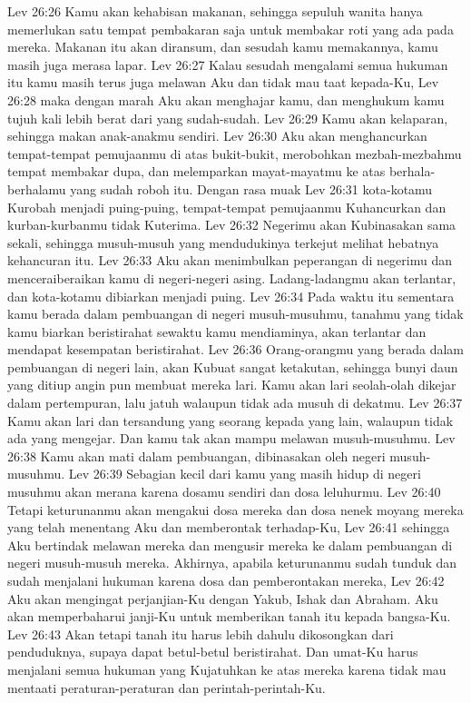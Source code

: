 Lev 26:26  Kamu akan kehabisan makanan, sehingga sepuluh wanita hanya memerlukan satu tempat pembakaran saja untuk membakar roti yang ada pada mereka. Makanan itu akan diransum, dan sesudah kamu memakannya, kamu masih juga merasa lapar.
Lev 26:27  Kalau sesudah mengalami semua hukuman itu kamu masih terus juga melawan Aku dan tidak mau taat kepada-Ku,
Lev 26:28  maka dengan marah Aku akan menghajar kamu, dan menghukum kamu tujuh kali lebih berat dari yang sudah-sudah.
Lev 26:29  Kamu akan kelaparan, sehingga makan anak-anakmu sendiri.
Lev 26:30  Aku akan menghancurkan tempat-tempat pemujaanmu di atas bukit-bukit, merobohkan mezbah-mezbahmu tempat membakar dupa, dan melemparkan mayat-mayatmu ke atas berhala-berhalamu yang sudah roboh itu. Dengan rasa muak
Lev 26:31  kota-kotamu Kurobah menjadi puing-puing, tempat-tempat pemujaanmu Kuhancurkan dan kurban-kurbanmu tidak Kuterima.
Lev 26:32  Negerimu akan Kubinasakan sama sekali, sehingga musuh-musuh yang mendudukinya terkejut melihat hebatnya kehancuran itu.
Lev 26:33  Aku akan menimbulkan peperangan di negerimu dan menceraiberaikan kamu di negeri-negeri asing. Ladang-ladangmu akan terlantar, dan kota-kotamu dibiarkan menjadi puing.
Lev 26:34  Pada waktu itu sementara kamu berada dalam pembuangan di negeri musuh-musuhmu, tanahmu yang tidak kamu biarkan beristirahat sewaktu kamu mendiaminya, akan terlantar dan mendapat kesempatan beristirahat.
Lev 26:36  Orang-orangmu yang berada dalam pembuangan di negeri lain, akan Kubuat sangat ketakutan, sehingga bunyi daun yang ditiup angin pun membuat mereka lari. Kamu akan lari seolah-olah dikejar dalam pertempuran, lalu jatuh walaupun tidak ada musuh di dekatmu.
Lev 26:37  Kamu akan lari dan tersandung yang seorang kepada yang lain, walaupun tidak ada yang mengejar. Dan kamu tak akan mampu melawan musuh-musuhmu.
Lev 26:38  Kamu akan mati dalam pembuangan, dibinasakan oleh negeri musuh-musuhmu.
Lev 26:39  Sebagian kecil dari kamu yang masih hidup di negeri musuhmu akan merana karena dosamu sendiri dan dosa leluhurmu.
Lev 26:40  Tetapi keturunanmu akan mengakui dosa mereka dan dosa nenek moyang mereka yang telah menentang Aku dan memberontak terhadap-Ku,
Lev 26:41  sehingga Aku bertindak melawan mereka dan mengusir mereka ke dalam pembuangan di negeri musuh-musuh mereka. Akhirnya, apabila keturunanmu sudah tunduk dan sudah menjalani hukuman karena dosa dan pemberontakan mereka,
Lev 26:42  Aku akan mengingat perjanjian-Ku dengan Yakub, Ishak dan Abraham. Aku akan memperbaharui janji-Ku untuk memberikan tanah itu kepada bangsa-Ku.
Lev 26:43  Akan tetapi tanah itu harus lebih dahulu dikosongkan dari penduduknya, supaya dapat betul-betul beristirahat. Dan umat-Ku harus menjalani semua hukuman yang Kujatuhkan ke atas mereka karena tidak mau mentaati peraturan-peraturan dan perintah-perintah-Ku.
